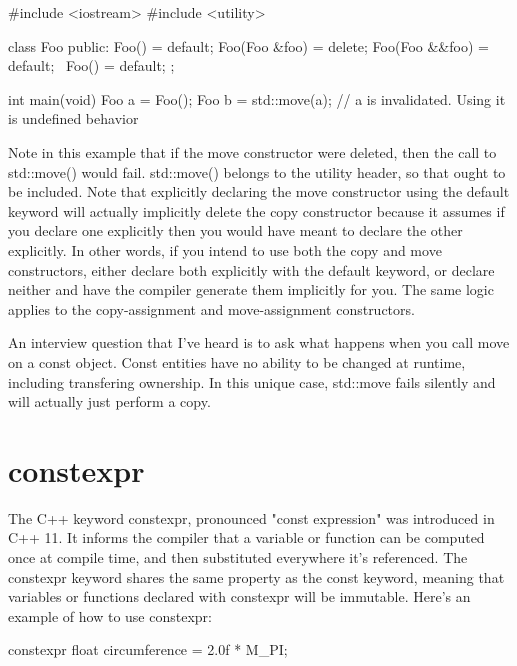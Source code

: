 \documentclass{article}
\begin{document}
\begin{cpplst}

#include <iostream>
#include <utility>

class Foo
{
public:
    Foo() = default;
    Foo(Foo &foo) = delete;
    Foo(Foo &&foo) = default;
    ~Foo() = default;
};

int main(void)
{
    Foo a = Foo();
    Foo b = std::move(a);
    // a is invalidated. Using it is undefined behavior
}

\end{cpplst}

Note in this example that if the move constructor were deleted, then the call to std::move() would fail.
std::move() belongs to the utility header, so that ought to be included. Note that explicitly declaring the
move constructor using the default keyword will actually implicitly delete the copy constructor because it
assumes if you declare one explicitly then you would have meant to declare the other explicitly. In other
words, if you intend to use both the copy and move constructors, either declare both explicitly with the
default keyword, or declare neither and have the compiler generate them implicitly for you. The same logic
applies to the copy-assignment and move-assignment constructors.

An interview question that I've heard is to ask what happens when you call move on a const object. Const
entities have no ability to be changed at runtime, including transfering ownership. In this unique case,
std::move fails silently and will actually just perform a copy.

\section{constexpr}

The C++ keyword constexpr, pronounced "const expression" was introduced in C++ 11. It informs the compiler
that a variable or function can be computed once at compile time, and then substituted everywhere it's
referenced. The constexpr keyword shares the same property as the const keyword, meaning that variables or
functions declared with constexpr will be immutable. Here's an example of how to use constexpr:

\begin{cpplst}

constexpr float circumference = 2.0f * M_PI;

\end{cpplst}
\end{document}
